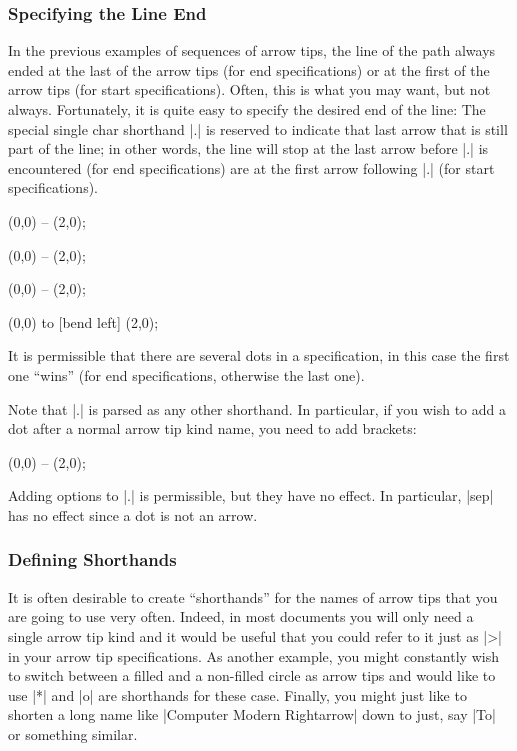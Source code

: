 \subsubsection{Specifying the Line End}

In the previous examples of sequences of arrow tips, the line of the path
always ended at the last of the arrow tips (for end specifications) or at the
first of the arrow tips (for start specifications). Often, this is what you may
want, but not always. Fortunately, it is quite easy to specify the desired end
of the line: The special single char shorthand |.| is reserved to indicate that
last arrow that is still part of the line; in other words, the line will stop
at the last arrow before |.| is encountered (for end specifications) are at the
first arrow following |.| (for start specifications).
%
\begin{codeexample}[]
 \draw [<<<->>>] (0,0) -- (2,0);
\end{codeexample}
\begin{codeexample}[]
 \draw [<.<<->.>>] (0,0) -- (2,0);
\end{codeexample}
\begin{codeexample}[]
 \draw [<<.<-.>>>] (0,0) -- (2,0);
\end{codeexample}
\begin{codeexample}[]
 \draw [<<.<->.>>] (0,0) to [bend left] (2,0);
\end{codeexample}

It is permissible that there are several dots in a specification, in this case
the first one ``wins'' (for end specifications, otherwise the last one).

Note that |.| is parsed as any other shorthand. In particular, if you wish to
add a dot after a normal arrow tip kind name, you need to add brackets:
%
\begin{codeexample}[]
  (0,0) -- (2,0);
\end{codeexample}
%
Adding options to |.| is permissible, but they have no effect. In particular,
|sep| has no effect since a dot is not an arrow.


\subsubsection{Defining Shorthands}
\label{section-arrow-tip-macro}

It is often desirable to create ``shorthands'' for the names of arrow tips that
you are going to use very often. Indeed, in most documents you will only need a
single arrow tip kind and it would be useful that you could refer to it just as
|>| in your arrow tip specifications. As another example, you might constantly
wish to switch between a filled and a non-filled circle as arrow tips and would
like to use |*| and |o| are shorthands for these case. Finally, you might just
like to shorten a long name like |Computer Modern Rightarrow| down to just, say
|To| or something similar.

